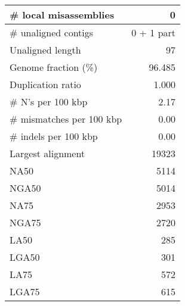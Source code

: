 \documentclass[12pt,a4paper]{article}
\begin{document}
\begin{table}[ht]
\begin{center}
\begin{tabular}{|l*{1}{|r}|}
\# local misassemblies & 0 \\ \hline
\# unaligned contigs & 0 + 1 part \\ \hline
Unaligned length & 97 \\ \hline
Genome fraction (\%) & 96.485 \\ \hline
Duplication ratio & 1.000 \\ \hline
\# N's per 100 kbp & 2.17 \\ \hline
\# mismatches per 100 kbp & 0.00 \\ \hline
\# indels per 100 kbp & 0.00 \\ \hline
Largest alignment & 19323 \\ \hline
NA50 & 5114 \\ \hline
NGA50 & 5014 \\ \hline
NA75 & 2953 \\ \hline
NGA75 & 2720 \\ \hline
LA50 & 285 \\ \hline
LGA50 & 301 \\ \hline
LA75 & 572 \\ \hline
LGA75 & 615 \\ \hline
\end{tabular}
\end{center}
\end{table}
\end{document}
